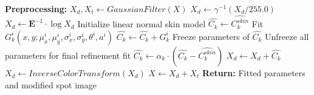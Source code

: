 \begin{spacing}{1.5}
\begin{algorithm}
\begin{algorithmic}[1]
    \State \textbf{Preprocessing:}
        \State $X_d, X_t \gets GaussianFilter(X)$ 
        \State $X_d \gets \gamma^{-1}(X_d/255.0)$ 
        \State $X_d \gets \mathbf{E}^{-1}\cdot\log{X_d}$ 
        \State Initialize linear normal skin model $\hat{C_k}\gets\hat{C_k^{skin}}$
            \State Fit $G_k^i(x, y; \mu_x^i, \mu_y^i, \sigma_x^i, \sigma_y^i, \theta^i, a^i)$
            \State $\hat{C_k} \gets \hat{C_k}+G_k^i$
            \State Freeze parameters of $\hat{C_k}$
        \EndFor
        \State Unfreeze all parameters for final refinement fit
        \State $\hat{C_k} \gets \alpha_k\cdot(\hat{C_k}-\hat{C_k^{skin}})$
    \EndFor
    \State $X_d \gets X_d+\hat{C_k}$
    \State $X_d \gets InverseColorTransform(X_d)$
    \State $X \gets X_d+X_t$
    \State \textbf{Return:} Fitted parameters and modified spot image
    \end{algorithmic}
    \end{algorithm}

\end{spacing}
